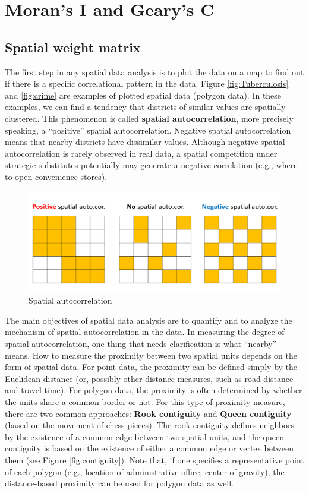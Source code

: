 \documentclass[10.5pt, A4paper, openany, uplatex]{book}
\numberwithin{equation}{section}
\begin{document}
\section{Moran's I and Geary's C}

\subsection{Spatial weight matrix}

The first step in any spatial data analysis is to plot the data on a map to find out if there is a specific correlational pattern in the data.
Figure \ref{fig:Tuberculosis} and \ref{fig:crime} are examples of plotted spatial data (polygon data).
In these examples, we can find a tendency that districts of similar values are spatially clustered.
This phenomenon is called \textbf{spatial autocorrelation}, more precisely speaking, a ``positive'' spatial autocorrelation.
Negative spatial autocorrelation means that nearby districts have dissimilar values.
Although negative spatial autocorrelation is rarely observed in real data, a spatial competition under strategic substitutes potentially may generate a negative correlation (e.g., where to open convenience stores).
\begin{figure}[h!]
	\begin{center}
		\includegraphics[width = 12cm]{spauto.png}
		\caption{Spatial autocorrelation}
	\end{center}
\end{figure}

The main objectives of spatial data analysis are to quantify and to analyze the mechanism of spatial autocorrelation in the data. 
In measuring the degree of spatial autocorrelation, one thing that needs clarification is what ``nearby'' means.
How to measure the proximity between two spatial units depends on the form of spatial data.
For point data, the proximity can be defined simply by the Euclidean distance (or, possibly other distance measures, such as road distance and travel time).
For polygon data, the proximity is often determined by whether the units share a common border or not.
For this type of proximity measure, there are two common approaches: \textbf{Rook contiguity} and \textbf{Queen contiguity} (based on the movement of chess pieces).
The rook contiguity defines neighbors by the existence of a common edge between two spatial units, and the queen contiguity is based on the existence of either a common edge or vertex between them (see Figure \ref{fig:contiguity}).
Note that, if one specifies a representative point of each polygon (e.g., location of administrative office, center of gravity), the distance-based proximity can be used for polygon data as well.
\end{document}
